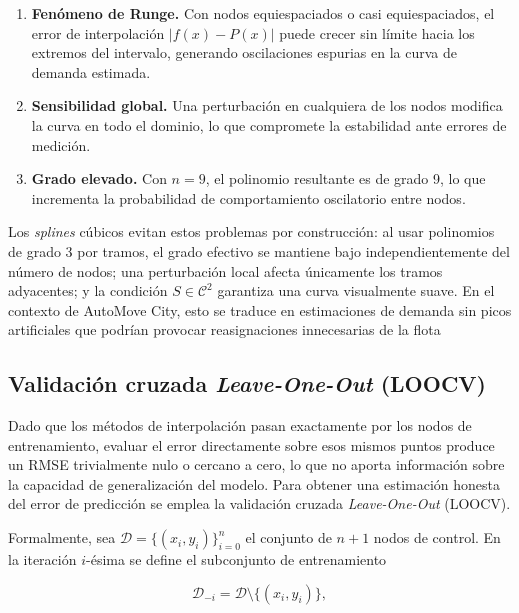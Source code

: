 \documentclass[conference]{IEEEtran}
\begin{document}
\begin{enumerate}
    \item \textbf{Fenómeno de Runge.} Con nodos equiespaciados o casi equiespaciados, el error de interpolación $|f(x) - P(x)|$ puede crecer sin límite
      hacia los extremos del intervalo, generando oscilaciones espurias en la curva de demanda estimada.

    \item \textbf{Sensibilidad global.} Una perturbación en cualquiera de los nodos modifica la curva en todo el dominio, lo que compromete la estabilidad
      ante errores de medición.

    \item \textbf{Grado elevado.} Con $n = 9$, el polinomio resultante es de grado 9, lo que incrementa la probabilidad de comportamiento oscilatorio
      entre nodos.
\end{enumerate}

Los \textit{splines} cúbicos evitan estos problemas por construcción: al usar polinomios de grado 3 por tramos, el grado efectivo se mantiene bajo
independientemente del número de nodos; una perturbación local afecta únicamente los tramos adyacentes; y la condición $S \in \mathcal{C}^2$ garantiza una
curva visualmente suave. En el contexto de AutoMove City, esto se traduce en estimaciones de demanda sin picos artificiales que podrían provocar
reasignaciones innecesarias de la flota

\subsection{Validación cruzada \textit{Leave-One-Out} (LOOCV)}

Dado que los métodos de interpolación pasan exactamente por los nodos
de entrenamiento, evaluar el error directamente sobre esos mismos
puntos produce un RMSE trivialmente nulo o cercano a cero, lo que
no aporta información sobre la capacidad de generalización del modelo.
Para obtener una estimación honesta del error de predicción se emplea
la validación cruzada \textit{Leave-One-Out} (LOOCV).

Formalmente, sea $\mathcal{D} = \{(x_i, y_i)\}_{i=0}^{n}$ el conjunto
de $n+1$ nodos de control. En la iteración $i$-ésima se define el
subconjunto de entrenamiento

\begin{equation}
\mathcal{D}_{-i} = \mathcal{D} \setminus \{(x_i, y_i)\},
\label{eq:loocv_set}
\end{equation}
\end{document}
